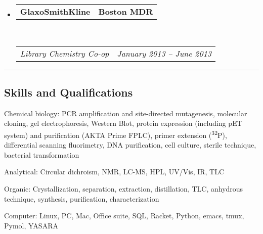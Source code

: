 \documentclass[10pt,letterpaper]{article}
\makeatletter
\newenvironment{indentsection}[1]%
{\begin{list}{}%
  {\setlength{\leftmargin}{#1}}%
  \item[]%
}
{\end{list}}
\newcommand{\headerrow}[2]
{\begin{tabular*}{\linewidth}{l@{\extracolsep{\fill}}r}
  #1 &
  #2 \\
\end{tabular*}}
\makeatother
\begin{document}
\begin{itemize}
\item
  \headerrow
      {\textbf{GlaxoSmithKline}}
      {\textbf{Boston MDR}}
  \\
  \headerrow
      {\emph{Library Chemistry Co-op}}
      {\emph{January 2013 -- June 2013}}

\end{itemize}

\hrule
\vspace{-0.4em}
\subsection*{Skills and Qualifications}

\begin{indentsection}{\parindent}
\begin{description*}
  \item[Chemical biology:]
    PCR amplification and site-directed mutagenesis, molecular cloning,
    gel electrophoresis, Western Blot, protein expression (including pET
    system) and purification (AKTA Prime FPLC), primer extension
  (\textsuperscript{32}P), differential scanning fluorimetry, DNA
    purification, cell culture, sterile technique, bacterial
    transformation
  \item[Analytical:]
    Circular dichroism, NMR, LC-MS, HPL, UV/Vis, IR, TLC
  \item[Organic:]
    Crystallization, separation, extraction, distillation, TLC,
    anhydrous technique, synthesis, purification, characterization
  \item[Computer:]
    Linux, PC, Mac, Office suite, SQL, Racket, Python, emacs, tmux,
    Pymol, YASARA
\end{description*}
\end{indentsection}
\end{document}
